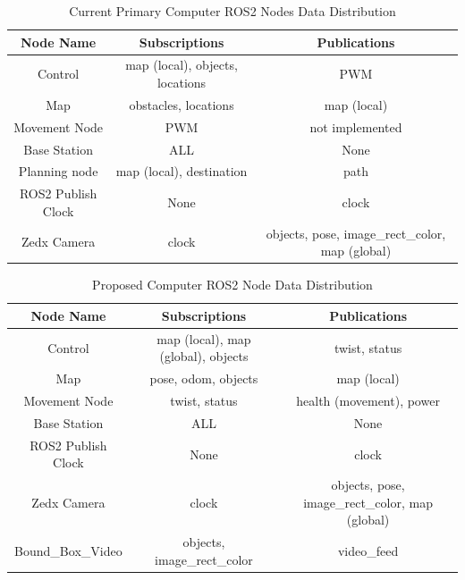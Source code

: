 \begin{table}[H]
    \centering
    \begin{tabular}{|c|c|c|}
        \hline
        \textbf{Node Name} & \textbf{Subscriptions} & \textbf{Publications} \\
        \hline
        Control & map (local), objects, locations &  PWM \\
        Map & obstacles, locations & map (local) \\
        Movement Node & PWM & not implemented \\
        Base Station & ALL & None \\
        Planning node & map (local), destination & path\\
        ROS2 Publish Clock & None & clock \\
        Zedx Camera & clock\footnotemark & objects, pose, image\_rect\_color, map (global) \\
        \hline
    \end{tabular}
    \caption{Current Primary Computer ROS2 Nodes Data Distribution}
    \label{tab:current-ros2-nodes}
\end{table}


\begin{table}[H]
    \centering
    \begin{tabular}{|c|c|c|}
        \hline
        \textbf{Node Name} & \textbf{Subscriptions} & \textbf{Publications} \\
        \hline
        Control & map (local), map (global), objects & twist, status\\
        Map & pose, odom, objects\footnotemark & map (local) \\
        Movement Node & twist, status & health (movement), power \\
        Base Station & ALL & None \\
        ROS2 Publish Clock & None & clock \\
        Zedx Camera & clock & objects, pose, image\_rect\_color, map (global) \\
        Bound\_Box\_Video & objects, image\_rect\_color & video\_feed \\
        \hline
    \end{tabular}
    \caption{Proposed Computer ROS2 Node Data Distribution}
    \label{tab:proposed-ros2-nodes}
\end{table}

